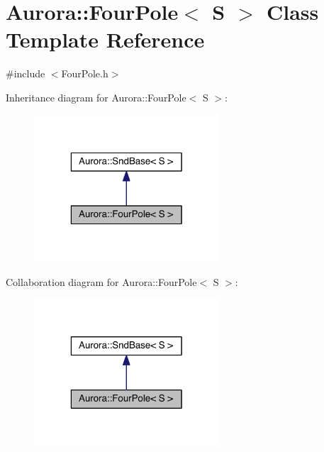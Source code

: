 \hypertarget{class_aurora_1_1_four_pole}{}\section{Aurora\+:\+:Four\+Pole$<$ S $>$ Class Template Reference}
\label{class_aurora_1_1_four_pole}


{\ttfamily \#include $<$Four\+Pole.\+h$>$}



Inheritance diagram for Aurora\+:\+:Four\+Pole$<$ S $>$\+:
\nopagebreak
\begin{figure}[H]
\begin{center}
\leavevmode
\includegraphics[width=196pt]{class_aurora_1_1_four_pole__inherit__graph}
\end{center}
\end{figure}


Collaboration diagram for Aurora\+:\+:Four\+Pole$<$ S $>$\+:
\nopagebreak
\begin{figure}[H]
\begin{center}
\leavevmode
\includegraphics[width=196pt]{class_aurora_1_1_four_pole__coll__graph}
\end{center}
\end{figure}
